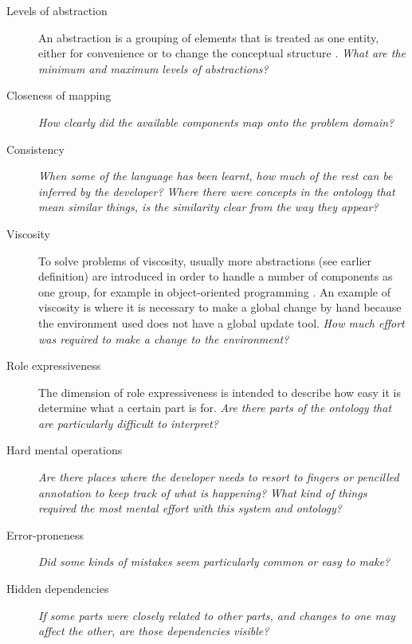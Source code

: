 \begin{description}
  \item[Levels of abstraction] 	\label{cdDef}
	An abstraction is a grouping of elements that is treated as one entity, either for convenience or to change the conceptual structure \cite{Green1996}. \emph{What are the minimum and maximum levels of abstractions?}
    \item[Closeness of mapping] \emph{How clearly did the available components map onto the problem domain?}
	\item[Consistency] \emph{When some of the language has been learnt, how much of the rest can be inferred by the developer? Where there were concepts in the ontology that mean similar things, is the similarity clear from the way they appear?}
	\item[Viscosity] To solve problems of viscosity, usually more abstractions (see earlier definition) are introduced in order to handle a number of components as one group, for example in object-oriented programming \cite{Green1996}. An example of viscosity is where it is necessary to make a global change by hand because the environment used does not have a global update tool. \emph{How much effort was required to make a change to the environment?}
	\item[Role expressiveness]
		The dimension of role expressiveness is intended to describe how easy it is determine what a certain part is for. \emph{Are there parts of the ontology that are particularly difficult to interpret?}
	\item[Hard mental operations] \emph{Are there places where the developer needs to resort to fingers or pencilled annotation to keep track of what is happening? What kind of things required the most mental effort with this system and ontology?}
	\item[Error-proneness] \emph{Did some kinds of mistakes seem particularly common or easy to make?}
	\item[Hidden dependencies] \emph{If some parts were closely related to other parts, and changes to one may affect the other, are those dependencies visible? }
\end{description}


 


